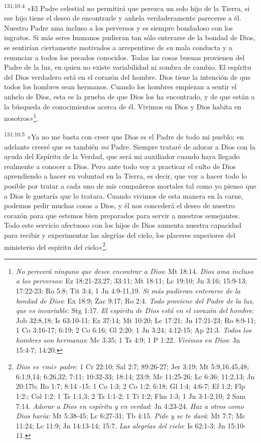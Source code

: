 \par
\textsuperscript{131:10.4} «El Padre celestial no permitirá que perezca un solo hijo de la Tierra, si ese hijo tiene el deseo de encontrarle y anhela verdaderamente parecerse a él. Nuestro Padre ama incluso a los perversos y es siempre bondadoso con los ingratos. Si más seres humanos pudieran tan sólo enterarse de la bondad de Dios, se sentirían ciertamente motivados a arrepentirse de su mala conducta y a renunciar a todos los pecados conocidos. Todas las cosas buenas provienen del Padre de la luz, en quien no existe variabilidad ni sombra de cambio. El espíritu del Dios verdadero está en el corazón del hombre. Dios tiene la intención de que todos los hombres sean hermanos. Cuando los hombres empiezan a sentir el anhelo de Dios, esta es la prueba de que Dios los ha encontrado, y de que están a la búsqueda de conocimientos acerca de él. Vivimos en Dios y Dios habita en nosotros»\footnote{\textit{No perecerá ninguno que desee encontrar a Dios}: Mt 18:14. \textit{Dios ama incluso a los perversos}: Ez 18:21-23,27; 33:11; Mt 18:11; Lc 19:10; Jn 3:16; 15:9-13; 17:22-23; Ro 5:8; Tit 3:4; 1 Jn 4:9-11,19. \textit{Si más pudieran enterarse de la bondad de Dios}: Ex 18:9; Zac 9:17; Ro 2:4. \textit{Todo proviene del Padre de la luz, que es invariable}: Stg 1:17. \textit{El espíritu de Dios está en el corazón del hombre}: Job 32:8,18; Is 63:10-11; Ez 37:14; Mt 10:20; Lc 17:21; Jn 17:21-23; Ro 8:9-11; 1 Co 3:16-17; 6:19; 2 Co 6:16; Gl 2:20; 1 Jn 3:24; 4:12-15; Ap 21:3. \textit{Todos los hombres son hermanos}: Mc 3:35; 1 Ts 4:9; 1 P 1:22. \textit{Vivimos en Dios}: Jn 15:4-7; 14:20.}.

\par
\textsuperscript{131:10.5} «Ya no me basta con creer que Dios es el Padre de todo mi pueblo; en adelante creeré que es también \textit{mi} Padre. Siempre trataré de adorar a Dios con la ayuda del Espíritu de la Verdad, que será mi auxiliador cuando haya llegado realmente a conocer a Dios. Pero ante todo voy a practicar el culto de Dios aprendiendo a hacer su voluntad en la Tierra, es decir, que voy a hacer todo lo posible por tratar a cada uno de mis compañeros mortales tal como yo pienso que a Dios le gustaría que lo tratara. Cuando vivimos de esta manera en la carne, podemos pedir muchas cosas a Dios, y él nos concederá el deseo de nuestro corazón para que estemos bien preparados para servir a nuestros semejantes. Todo este servicio afectuoso con los hijos de Dios aumenta nuestra capacidad para recibir y experimentar las alegrías del cielo, los placeres superiores del ministerio del espíritu del cielo»\footnote{\textit{Dios es «mi» padre}: 1 Cr 22:10; Sal 2:7; 89:26-27; Jer 3:19; Mt 5:9,16,45,48; 6:1,9,14; 6:26,32; 7:11; 10:32-33; 18:14; 23:9; Mc 11:25-26; Lc 6:36; 11:2,13; Jn 20:17b; Ro 1:7; 8:14 -15; 1 Co 1:3; 2 Co 1:2; 6:18; Gl 1:4; 4:6-7; Ef 1:2; Flp 1:2:; Col 1:2; 1 Ts 1:1,3; 2 Ts 1:1-2; 1 Ti 1:2; Flm 1:3; 1 Jn 3:1-2,10; 2 Sam 7:14. \textit{Adorar a Dios en espíritu y en verdad}: Jn 4:23-24. \textit{Haz a otros como Dios haría}: Mt 5:38-45; Lc 6:27-31; Tb 4:15. \textit{Pide y se te dará}: Mt 7:7; Mc 11:24; Lc 11:9; Jn 14:13-14; 15:7. \textit{Las alegrías del cielo}: Is 62:1-3; Jn 15:10-11.}.


